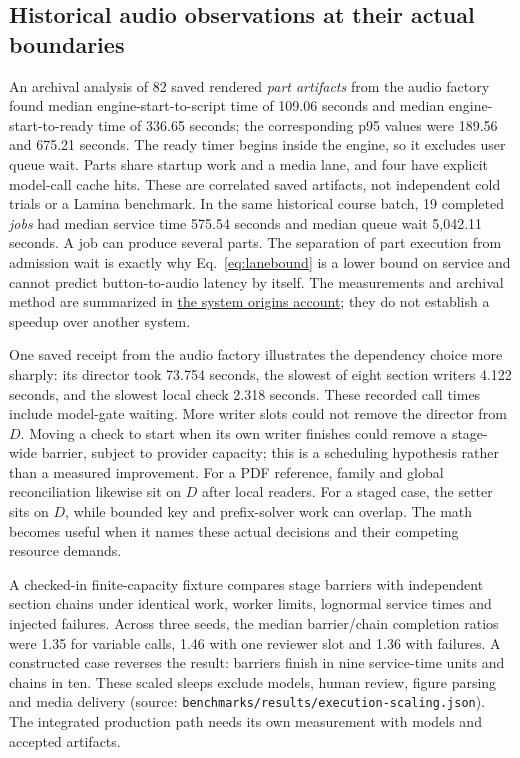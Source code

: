 \documentclass[11pt,letterpaper]{article}
\begin{document}
\subsection{Historical audio observations at their actual boundaries}
An archival analysis of 82 saved rendered \emph{part artifacts} from the audio factory found median engine-start-to-script time of 109.06 seconds and median engine-start-to-ready time of 336.65 seconds; the corresponding p95 values were 189.56 and 675.21 seconds. The ready timer begins inside the engine, so it excludes user queue wait. Parts share startup work and a media lane, and four have explicit model-call cache hits. These are correlated saved artifacts, not independent cold trials or a Lamina benchmark. In the same historical course batch, 19 completed \emph{jobs} had median service time 575.54 seconds and median queue wait 5,042.11 seconds. A job can produce several parts. The separation of part execution from admission wait is exactly why Eq.~\ref{eq:lanebound} is a lower bound on service and cannot predict button-to-audio latency by itself. The measurements and archival method are summarized in \href{https://github.com/FadiBahodi/lamina/blob/main/docs/system-origins.md}{the system origins account}; they do not establish a speedup over another system.

One saved receipt from the audio factory illustrates the dependency choice more sharply: its director took 73.754 seconds, the slowest of eight section writers 4.122 seconds, and the slowest local check 2.318 seconds. These recorded call times include model-gate waiting. More writer slots could not remove the director from $D$. Moving a check to start when its own writer finishes could remove a stage-wide barrier, subject to provider capacity; this is a scheduling hypothesis rather than a measured improvement. For a PDF reference, family and global reconciliation likewise sit on $D$ after local readers. For a staged case, the setter sits on $D$, while bounded key and prefix-solver work can overlap. The math becomes useful when it names these actual decisions and their competing resource demands.

A checked-in finite-capacity fixture compares stage barriers with independent section chains under identical work, worker limits, lognormal service times and injected failures. Across three seeds, the median barrier/chain completion ratios were 1.35 for variable calls, 1.46 with one reviewer slot and 1.36 with failures. A constructed case reverses the result: barriers finish in nine service-time units and chains in ten. These scaled sleeps exclude models, human review, figure parsing and media delivery (source: \texttt{benchmarks/results/execution-scaling.json}). The integrated production path needs its own measurement with models and accepted artifacts.
\end{document}
